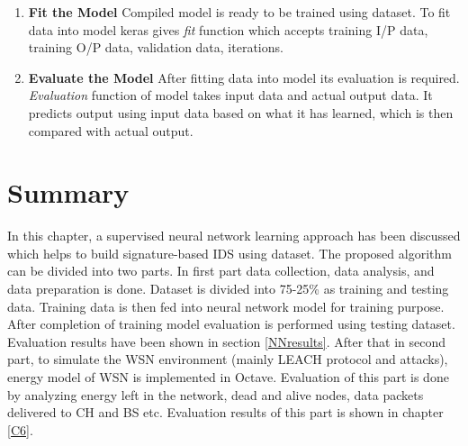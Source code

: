 \begin{enumerate}[label=\textbf{\roman*}.]
\item \textbf{Fit the Model } Compiled model is ready to be trained using dataset. To fit data into model keras gives \textit{fit} function which accepts training I/P data, training O/P data, validation data, iterations.

\item \textbf{Evaluate the Model } After fitting data into model its evaluation is required. \textit{Evaluation} function of model takes input data and actual output data. It predicts output using input data based on what it has learned, which is then compared with actual output. 

\end{enumerate}    

        
\section{Summary} \label{SSummary}
In this chapter, a supervised neural network learning approach has been discussed which helps to build signature-based IDS using dataset. The proposed algorithm can be divided into two parts. In first part data collection, data analysis, and data preparation is done. Dataset is divided into 75-25\% as training and testing data.  Training data is then fed into neural network model for training purpose. After completion of training model evaluation is performed using testing dataset. Evaluation results have been shown in section \ref{NNresults}.
After that in second part, to simulate the WSN environment (mainly LEACH protocol and attacks), energy model of WSN is implemented in Octave. Evaluation of this part is done by analyzing energy left in the network, dead and alive nodes, data packets delivered to CH and BS etc. Evaluation results of this part is shown in chapter \ref{C6}.
 
